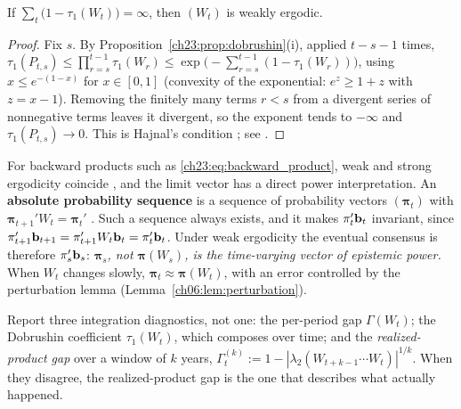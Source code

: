\documentclass[../structural_economics_book.tex]{subfiles}
\begin{document}
\begin{proposition}\label{ch23:prop:hajnal}
If $\sum_{t}\bigl(1 - \tau_1(W_t)\bigr) = \infty$, then $(W_t)$ is weakly ergodic.
\end{proposition}
\begin{proof}
Fix $s$. By Proposition~\ref{ch23:prop:dobrushin}(i), applied $t-s-1$ times, $\tau_1(P_{t,s}) \le \prod_{r=s}^{t-1}\tau_1(W_r) \le \exp\bigl(-\sum_{r=s}^{t-1}(1-\tau_1(W_r))\bigr)$, using $x \le e^{-(1-x)}$ for $x \in [0,1]$ (convexity of the exponential: $e^{z} \ge 1 + z$ with $z = x - 1$). Removing the finitely many terms $r < s$ from a divergent series of nonnegative terms leaves it divergent, so the exponent tends to $-\infty$ and $\tau_1(P_{t,s}) \to 0$. This is Hajnal's condition \citep{hajnal1958weak}; see \citet[Sect.~4.4]{seneta2006nonnegative}.
\end{proof}

For backward products such as \eqref{ch23:eq:backward_product}, weak and strong ergodicity coincide \citep[ch.~4]{chatterjee1977towards,seneta2006nonnegative}, and the limit vector has a direct power interpretation. An \textbf{absolute probability sequence} is a sequence of probability vectors $(\boldsymbol{\pi}_t)$ with $\boldsymbol{\pi}_{t+1}'W_t = \boldsymbol{\pi}_t'$ \citep{kolmogorov1936theorie,touri2014product}. Such a sequence always exists, and it makes $\pi_t'\mathbf{b}_t$ invariant, since $\pi_{t+1}'\mathbf{b}_{t+1} = \pi_{t+1}'W_t\mathbf{b}_t = \pi_t'\mathbf{b}_t$. Under weak ergodicity the eventual consensus is therefore $\pi_s'\mathbf{b}_s$: \emph{$\boldsymbol{\pi}_s$, not $\boldsymbol{\pi}(W_s)$, is the time-varying vector of epistemic power.} When $W_t$ changes slowly, $\boldsymbol{\pi}_t \approx \boldsymbol{\pi}(W_t)$, with an error controlled by the perturbation lemma (Lemma~\ref{ch06:lem:perturbation}).

\begin{keyinsight}
Report three integration diagnostics, not one: the per-period gap $\Gamma(W_t)$; the Dobrushin coefficient $\tau_1(W_t)$, which composes over time; and the \emph{realized-product gap} over a window of $k$ years, $\Gamma^{(k)}_t := 1 - |\lambda_2(W_{t+k-1}\cdots W_t)|^{1/k}$. When they disagree, the realized-product gap is the one that describes what actually happened.
\end{keyinsight}
\end{document}
